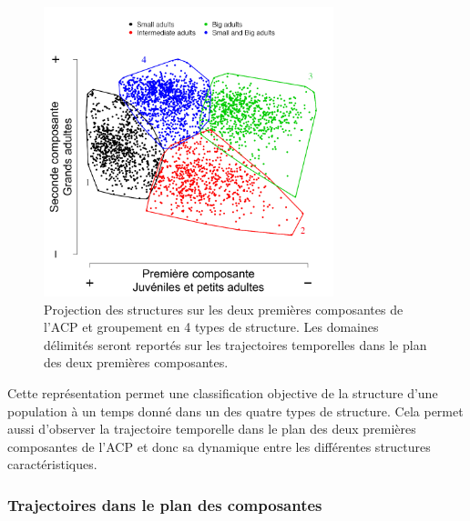 \begin{figure}[!ht]
\begin{center}
\includegraphics[width=0.75\textwidth]{1_CorpsDeThese/Resumes/Fig/SP03b}
\caption[Projection des données
sur les deux premières composantes]{Projection des structures sur les deux
premières composantes de l'ACP et groupement en 4 types de structure. Les
domaines délimités seront reportés sur les trajectoires temporelles dans le
plan des deux premières composantes.}
\label{fig:SP3}
\end{center}
\end{figure}

Cette représentation permet une classification objective de la structure d'une
population à un temps donné dans un des quatre types de structure. Cela permet
aussi d'observer la trajectoire temporelle dans le plan des deux premières
composantes de l'ACP et donc sa dynamique entre les différentes structures caractéristiques. 

\subsubsection{Trajectoires dans le plan des composantes}

